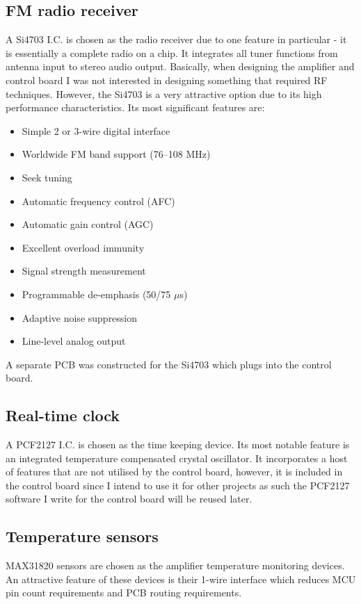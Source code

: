 \documentclass[a4paper,10pt, oneside]{article}
\begin{document}
\subsection*{FM radio receiver}
A Si4703 I.C. is chosen as the radio receiver due to one feature in particular - it is essentially a complete radio on a chip. 
It integrates all tuner functions from antenna input to stereo audio output. Basically, when designing the amplifier and control 
board I was not interested in designing something that required RF techniques. However, the Si4703 is a very attractive option due 
to its high performance characteristics. Its most significant features are:
\begin{itemize}
	\item Simple 2 or 3-wire digital interface
	\item Worldwide FM band support (76–108 MHz)
	\item Seek tuning
	\item Automatic frequency control (AFC)
	\item Automatic gain control (AGC)
	\item Excellent overload immunity
	\item Signal strength measurement
	\item Programmable de-emphasis (50/75 $\mu$s)
	\item Adaptive noise suppression
	\item Line-level analog output
\end{itemize}
A separate PCB was constructed for the Si4703 which plugs into the control board. 
\subsection*{Real-time clock}
A PCF2127 I.C. is chosen as the time keeping device. Its most notable feature is an integrated temperature compensated crystal 
oscillator. It incorporates a host of features that are not utilised by the control board, however, it is included in the control 
board since I intend to use it for other projects as such the PCF2127 software I write for the control board will be reused later. 
\subsection*{Temperature sensors}
MAX31820 sensors are chosen as the amplifier temperature monitoring devices. An 
attractive feature of these devices is their 1-wire interface which reduces MCU
pin count requirements and PCB routing requirements. 
\end{document}
